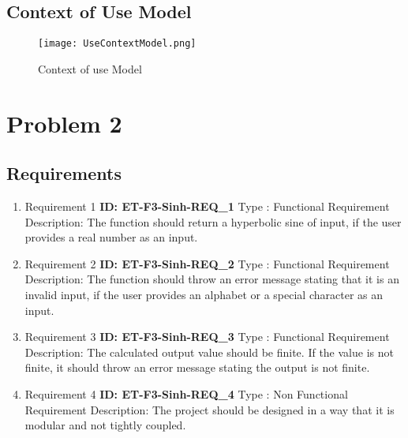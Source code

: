 \documentclass{article}
\begin{document}
\subsection{Context of Use Model}
\begin{figure}[htp]
    \centering
    \texttt{[image: UseContextModel.png]}
    \caption{Context of use Model}
    \label{Context of use Model}
\end{figure}
\section{Problem 2}
\subsection{Requirements}
\begin{enumerate}
\item Requirement 1 \newline
\textbf{ID: ET-F3-Sinh-REQ\_1}\newline
Type : Functional Requirement\newline
Description: The function should return a hyperbolic sine of input, if the user provides a real number as an input.\newline\newline\newline
\item Requirement 2 \newline
\textbf{ID: ET-F3-Sinh-REQ\_2}\newline
Type : Functional Requirement\newline
Description: The function should throw an error message stating that it is an invalid input, if the user provides an alphabet or a special character as an input.\newline
\item Requirement 3 \newline
\textbf{ID: ET-F3-Sinh-REQ\_3}\newline
Type : Functional Requirement\newline
Description: The calculated output value should be finite. If the value is not finite, it should throw an error message stating the output is not finite.\newline
\item Requirement 4 \newline
\textbf{ID: ET-F3-Sinh-REQ\_4}\newline
Type : Non Functional Requirement\newline
Description: The project should be designed in a way that it is modular and not tightly coupled.\newline
\end{enumerate}
\end{document}
